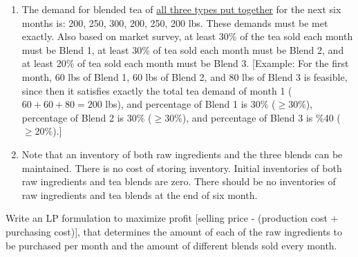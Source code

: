\documentclass[11pt]{article}
\begin{document}
\begin{enumerate}
\begin{enumerate}
\item The demand for blended tea of \underline{all three types put together} 
for the next six months is: 200, 250, 300, 200, 250, 200 lbs. These demands must be met exactly. Also based on market survey, at least $30\%$ of the tea sold each month must be Blend 1, at least $30\%$ of tea sold each month must be Blend 2, and at least $20\%$ of tea sold each month must be Blend 3. [Example: For the first month,
60 lbs of Blend 1, 60 lbs of Blend 2, and 80 lbs of Blend 3 is feasible, since then it satisfies exactly the total tea demand of month 1 ($60 + 60 + 80 = 200$ lbs), and percentage of Blend 1 is 30\% ($\geq 30\%$), percentage of Blend 2 is 30\% ($\geq 30\%$), and percentage of Blend 3 is \%40 ($\geq 20\%$).]

\item Note that an inventory of both raw ingredients and the three blends can be maintained. There is no cost of storing inventory. Initial inventories of both raw ingredients and tea blends are zero. There should be no inventories of raw ingredients and tea blends at the end of six month. 
\end{enumerate}
Write an LP formulation to maximize profit [selling price - (production cost + purchasing cost)], that determines the amount of each of the raw ingredients to be purchased per month and the amount of different blends sold every month.


\end{enumerate}
\end{document}
